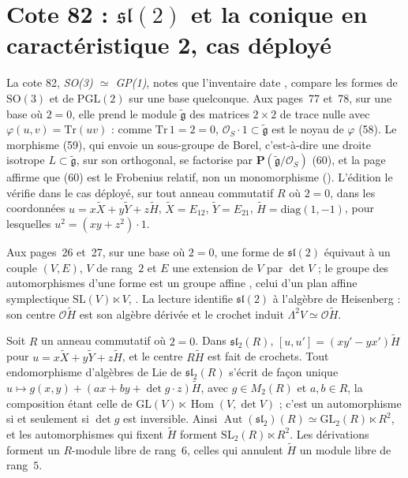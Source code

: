 \section[Cote 82 : $\mathfrak{sl}(2)$ et la conique en caractéristique 2, cas déployé]{Cote 82 : $\mathfrak{sl}(2)$ et la conique en caractéristique 2, cas déployé\protect{}}\label{sec:82}

La cote 82, \emph{SO(3) $\simeq$ GP(1)}, notes que l'inventaire date \q{[vers 1982]}, compare les formes de $\mathrm{SO}(3)$ et de $\mathrm{PGL}(2)$ sur une base quelconque. Aux pages~77 et~78, sur une base où $2 = 0$, elle prend le module $\tilde{\mathfrak g}$ des matrices $2 \times 2$ de trace nulle avec $\varphi(u, v) = \mathrm{Tr}(uv)$ : comme $\mathrm{Tr}\,1 = 2 = 0$, $\mathcal O_S \cdot 1 \subset \tilde{\mathfrak g}$ est le noyau de $\varphi$ (58). Le morphisme (59), qui envoie un sous-groupe de Borel, c'est-à-dire une droite isotrope $L \subset \tilde{\mathfrak g}$, sur son orthogonal, se factorise par $\mathbf P(\tilde{\mathfrak g}/\mathcal O_S)$ (60), et la page affirme que (60) est le Frobenius relatif, non un monomorphisme (). L'édition le vérifie dans le cas déployé, sur tout anneau commutatif $R$ où $2 = 0$, dans les coordonnées $u = x\tilde X + y\tilde Y + z\tilde H$, $\tilde X = E_{12}$, $\tilde Y = E_{21}$, $\tilde H = \mathrm{diag}(1, -1)$, pour lesquelles $u^2 = (xy + z^2) \cdot 1$.

Aux pages~26 et~27, sur une base où $2 = 0$, une forme de $\mathfrak{sl}(2)$ équivaut à un couple $(V, E)$, $V$ de rang~$2$ et $E$ une extension de $V$ par $\det V$ ; le groupe des automorphismes d'une forme est un groupe affine , celui d'un plan affine symplectique $\mathrm{SL}(V) \ltimes V$, . La lecture identifie $\mathfrak{sl}(2)$ à l'algèbre de Heisenberg : son centre $\mathcal O \tilde H$ est son algèbre dérivée et le crochet induit $\Lambda^2 V \simeq \mathcal O \tilde H$.

\begin{encadre}
\begin{theoreme}
Soit $R$ un anneau commutatif où $2 = 0$. Dans $\mathfrak{sl}_2(R)$, $[u, u'] = (xy' - yx')\tilde H$ pour $u = x\tilde X + y\tilde Y + z\tilde H$, et le centre $R\tilde H$ est fait de crochets. Tout endomorphisme d'algèbres de Lie de $\mathfrak{sl}_2(R)$ s'écrit de façon unique $u \mapsto g(x, y) + (ax + by + \det g \cdot z)\tilde H$, avec $g \in M_2(R)$ et $a, b \in R$, la composition étant celle de $\mathrm{GL}(V) \ltimes \operatorname{Hom}(V, \det V)$ ; c'est un automorphisme si et seulement si $\det g$ est inversible. Ainsi $\operatorname{Aut}(\mathfrak{sl}_2)(R) \simeq \mathrm{GL}_2(R) \ltimes R^2$, et les automorphismes qui fixent $\tilde H$ forment $\mathrm{SL}_2(R) \ltimes R^2$. Les dérivations forment un $R$-module libre de rang~$6$, celles qui annulent $\tilde H$ un module libre de rang~$5$.
\end{theoreme}
\end{encadre}

